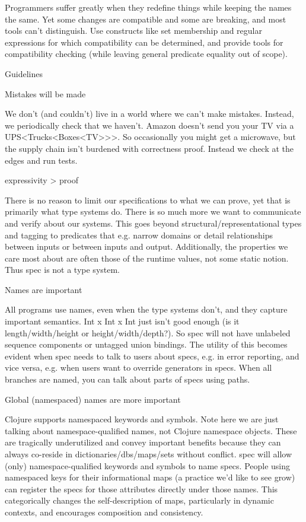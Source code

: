 Programmers suffer greatly when they redefine things while keeping the names the same. Yet some changes are compatible and some are breaking, and most tools can’t distinguish. Use constructs like set membership and regular expressions for which compatibility can be determined, and provide tools for compatibility checking (while leaving general predicate equality out of scope).

Guidelines

Mistakes will be made

We don’t (and couldn’t) live in a world where we can’t make mistakes. Instead, we periodically check that we haven’t. Amazon doesn’t send you your TV via a UPS<Trucks<Boxes<TV>>>. So occasionally you might get a microwave, but the supply chain isn’t burdened with correctness proof. Instead we check at the edges and run tests.

expressivity > proof

There is no reason to limit our specifications to what we can prove, yet that is primarily what type systems do. There is so much more we want to communicate and verify about our systems. This goes beyond structural/representational types and tagging to predicates that e.g. narrow domains or detail relationships between inputs or between inputs and output. Additionally, the properties we care most about are often those of the runtime values, not some static notion. Thus spec is not a type system.

Names are important

All programs use names, even when the type systems don’t, and they capture important semantics. Int x Int x Int just isn’t good enough (is it length/width/height or height/width/depth?). So spec will not have unlabeled sequence components or untagged union bindings. The utility of this becomes evident when spec needs to talk to users about specs, e.g. in error reporting, and vice versa, e.g. when users want to override generators in specs. When all branches are named, you can talk about parts of specs using paths.

Global (namespaced) names are more important

Clojure supports namespaced keywords and symbols. Note here we are just talking about namespace-qualified names, not Clojure namespace objects. These are tragically underutilized and convey important benefits because they can always co-reside in dictionaries/dbs/maps/sets without conflict. spec will allow (only) namespace-qualified keywords and symbols to name specs. People using namespaced keys for their informational maps (a practice we’d like to see grow) can register the specs for those attributes directly under those names. This categorically changes the self-description of maps, particularly in dynamic contexts, and encourages composition and consistency.

